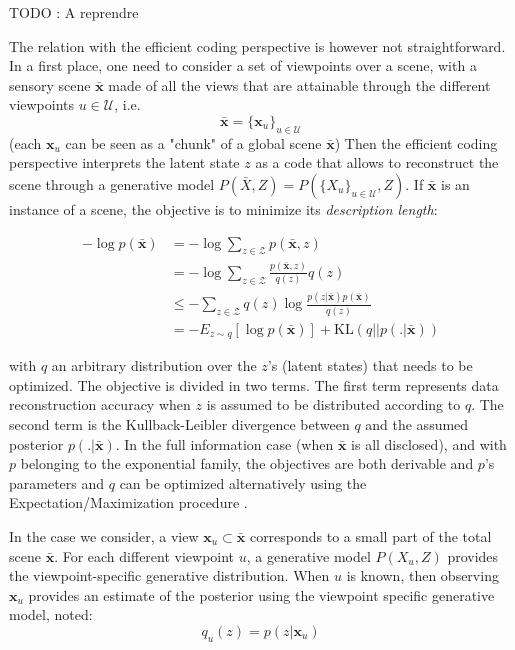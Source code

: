 \documentclass{article}
\begin{document}
{\color{magenta} TODO : A reprendre}

The relation with the efficient coding perspective \cite{hinton1994autoencoders} is however not straightforward. 
In a first place, one need to consider a set of viewpoints over a scene, with a sensory scene $\bar{\boldsymbol{x}}$ made of all the views that are attainable through the different viewpoints $u \in \mathcal{U}$, i.e. $$\bar{\boldsymbol{x}} = \{\boldsymbol{x}_u\}_{u\in \mathcal{U}}$$
(each $\boldsymbol{x}_u$ can be seen as a "chunk" of a global scene $\bar{\boldsymbol{x}}$)
Then the efficient coding perspective interprets the latent state $z$ as a code that allows to reconstruct the scene through a generative model $P(\bar{X}, Z) = P(\{X_u\}_{u \in \mathcal{U}}, Z)$. If $\bar{\boldsymbol{x}}$ is an instance of a scene, the objective is to minimize its \emph{description length}:

\begin{align}
-\log p(\bar{\boldsymbol{x}}) 
&= -\log \sum_{z \in \mathcal{Z}} p(\bar{\boldsymbol{x}}, z)\nonumber\\
&= -\log \sum_{z \in \mathcal{Z}} \frac{p(\bar{\boldsymbol{x}}, z)}{q(z)}q(z)\nonumber\\
&\leq  -\sum_{z \in \mathcal{Z}} q(z) \log\frac{p(z|\bar{\boldsymbol{x}})p(\bar{\boldsymbol{x}})}{q(z)}\nonumber\\
&= -E_{z\sim q} \left[ \log p(\bar{\boldsymbol{x}})\right]
+ \text{KL} (q||p(.|\bar{\boldsymbol{x}}))\label{eq:coding}
\end{align}

with $q$ an arbitrary distribution over the $z$'s (latent states) that needs to be optimized. The objective is divided in two terms. The first term represents data reconstruction accuracy when $z$ is assumed to be distributed according to $q$. The second term is the Kullback-Leibler divergence between $q$ and the assumed posterior $p(.|\bar{\boldsymbol{x}})$. In the full information case (when $\bar{\boldsymbol{x}}$ is all disclosed), and with $p$ belonging to the exponential family, the objectives are both derivable and $p$'s parameters and $q$ can be optimized alternatively using the Expectation/Maximization procedure \cite{Dempster1977}. 

In the case we consider, a view $\boldsymbol{x}_u \subset \bar{\boldsymbol{x}}$ corresponds to a small part of the total scene $\bar{\boldsymbol{x}}$. For each different viewpoint $u$, a  generative model $P(X_u, Z)$ provides the viewpoint-specific generative  distribution. When $u$ is known, then observing $\boldsymbol{x}_u$ provides an estimate of the posterior using the viewpoint specific generative model, noted: 
$$q_u(z) = p(z|\boldsymbol{x}_u)$$
\end{document}
